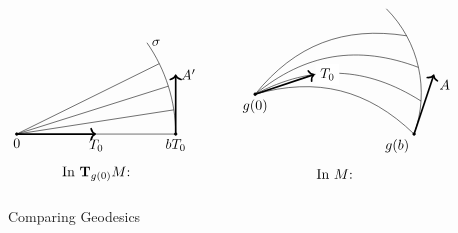 \documentclass[../../main]{subfiles}
\begin{document}
\begin{figure}[h!]
\[
\begin{tikzpicture}
    \begin{scope}
    \filldraw (0,0) circle (1pt) node[anchor=north] {$0$};
    \draw[very thick, ->] (0,0)--(2,0) node[anchor=north] {$T_0$};
    \filldraw (2,0)--(4,0) circle (1pt) node[anchor=north] {$bT_0$};
    \draw[very thick, ->] (4,0)--(4,1.5) node[anchor=west] {$A'$};
    
    \draw (4,0) arc (0:35:4cm)
        coordinate[pos=0.25](P1)
        coordinate[pos=0.5](P2)
        coordinate[pos=0.75](P3)
        node[anchor=west] {$\sigma$};

    \foreach \i in {1,2,3}
    {
        \draw (0,0)--(P\i);
    }
    \end{scope}
    
    \begin{scope}[shift={(6,1)}]
    \filldraw (0,0) circle (1pt) node[anchor=north]{$g(0)$};
    \filldraw (4,-1) circle (1pt) node[anchor=north east]{$g(b)$};
    
    \draw (0,0) to[bend left] (4,-1);
        
    \draw (4,-1) arc (-20:45:3cm)
        coordinate[pos=0.25](P1)
        coordinate[pos=0.5](P2)
        coordinate[pos=0.75](P3);
        
    \foreach \i in {1,2,3}
    {
        \draw (0,0) to[bend left=30] (P\i);
    }
    
    \draw[very thick, ->]
        (0,0)--(1.5,0.5) node[anchor=west, fill=white] {$T_0$};
    \draw[very thick, ->]
        (4,-1)--(4.5,0.5) node[anchor=north west] {$A$};
    \end{scope}
    
    \draw (2,-1) node {In $\tangentspace{M}{g(0)}$:};
    \draw (8,-1) node {In $M$:};
\end{tikzpicture}
\]
\caption{Comparing Geodesics}
\label{fig:ch10fig3}
\end{figure}
\end{document}
